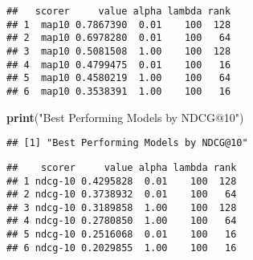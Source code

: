 \documentclass[]{article}
\newenvironment{Shaded}{\begin{snugshade}}{\end{snugshade}}
\newcommand{\KeywordTok}[1]{\textcolor[rgb]{0.13,0.29,0.53}{\textbf{#1}}}
\newcommand{\StringTok}[1]{\textcolor[rgb]{0.31,0.60,0.02}{#1}}
\newcommand{\OperatorTok}[1]{\textcolor[rgb]{0.81,0.36,0.00}{\textbf{#1}}}
\newcommand{\NormalTok}[1]{#1}
\begin{document}
\begin{Shaded}
\end{Shaded}

\begin{verbatim}
##   scorer     value alpha lambda rank
## 1  map10 0.7867390  0.01    100  128
## 2  map10 0.6978280  0.01    100   64
## 3  map10 0.5081508  1.00    100  128
## 4  map10 0.4799475  0.01    100   16
## 5  map10 0.4580219  1.00    100   64
## 6  map10 0.3538391  1.00    100   16
\end{verbatim}

\begin{Shaded}
\begin{Highlighting}[]
\KeywordTok{print}\NormalTok{(}\StringTok{"Best Performing Models by NDCG@10"}\NormalTok{)}
\end{Highlighting}
\end{Shaded}

\begin{verbatim}
## [1] "Best Performing Models by NDCG@10"
\end{verbatim}

\begin{Shaded}
\end{Shaded}

\begin{verbatim}
##    scorer     value alpha lambda rank
## 1 ndcg-10 0.4295828  0.01    100  128
## 2 ndcg-10 0.3738932  0.01    100   64
## 3 ndcg-10 0.3189858  1.00    100  128
## 4 ndcg-10 0.2780850  1.00    100   64
## 5 ndcg-10 0.2516068  0.01    100   16
## 6 ndcg-10 0.2029855  1.00    100   16
\end{verbatim}
\end{document}
